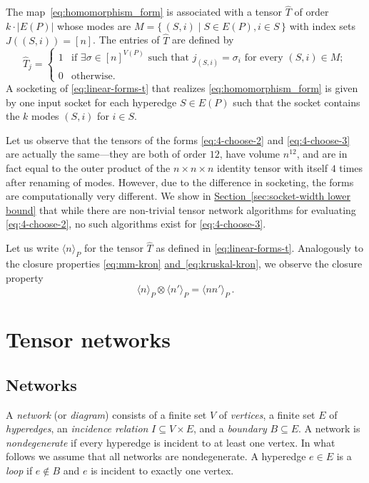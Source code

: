 \documentclass[11pt]{article}
\numberwithin{equation}{section}
\theoremstyle{definition}
\theoremstyle{plain}
\newcommand{\expref}[2]{\hyperref[#2]{#1~\ref{#2}}}
\newcommand{\expeqref}[2]{\hyperref[#2]{#1~\eqref{#2}}}
\newcommand{\bra}{\ensuremath{\langle}}
\newcommand{\ket}{\ensuremath{\rangle}}
\begin{document}
The map~\eqref{eq:homomorphism_form} is associated with a tensor $\hat{T}$ of 
order $k \cdot |E(P)|$ whose modes are
%
%
$M = \{\,(S,i) \mid S \in E(P), i \in S \,\}$ with index sets
%
$J((S,i)) = [n]$. The entries of $\hat{T}$ are defined by
\begin{equation}
\label{eq:linear-forms-t}
\hat{T}_j=
\begin{cases}
1 & \text{if $\exists \sigma \in [n]^{V(P)}$ such that $j_{(S,i)}=\sigma_i$ for every $(S,i) \in M$};\\
0 & \text{otherwise}.
\end{cases}
\end{equation}
A socketing of \eqref{eq:linear-forms-t} that realizes \eqref{eq:homomorphism_form} is given by one input socket for each hyperedge $S \in E(P)$ such that
the socket contains the $k$ modes $(S,i)$ for $i \in S$.

Let us observe that the tensors of the forms \eqref{eq:4-choose-2} and
\eqref{eq:4-choose-3} are actually the same---they are both of order
$12$, have volume $n^{12}$, and are in fact equal to the outer product
of the $n \times n \times n$ identity tensor with itself $4$ times
after renaming of modes.  However, due to the difference in
socketing, the forms are computationally very different.
We show in \expref{Section}{sec:socket-width lower bound} that while there
are non-trivial tensor network algorithms for evaluating
\eqref{eq:4-choose-2}, no such algorithms exist for
\eqref{eq:4-choose-3}.

Let us write $\bra n\ket_P$
for the tensor $\hat{T}$ as defined
in \eqref{eq:linear-forms-t}. Analogously to the closure
properties \eqref{eq:mm-kron} \expeqref{and}{eq:kruskal-kron}, we observe the
closure property
\begin{equation}
  \label{eq:binom-kron}
  \bra n\ket_P \otimes \bra n'\ket_P = \bra nn'\ket_P\,.
\end{equation}

\section{Tensor networks}
\label{sec:tensor network defs}

\subsection{Networks}

A \emph{network} (or \emph{diagram})
consists of a finite set $V$ of \emph{vertices},
a finite set $E$ of \emph{hyperedges},
an \emph{incidence relation} $I\subseteq V\times E$, and
a \emph{boundary} $B\subseteq E$.
A network is \emph{nondegenerate} if every hyperedge is incident to at least
one vertex. In what follows we assume that all networks are nondegenerate.
A hyperedge $e\in E$ is a \emph{loop} if $e\notin B$ and $e$ is incident
to exactly one vertex.
\end{document}
